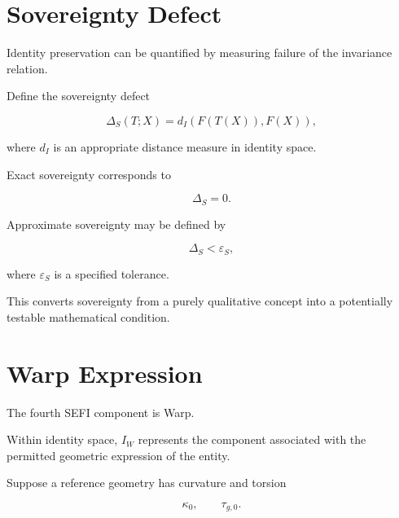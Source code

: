 \documentclass[12pt,oneside]{book}
\begin{document}
\section{Sovereignty Defect}
\label{sec:sovereignty-defect}

Identity preservation can be quantified by measuring failure of
the invariance relation.

Define the sovereignty defect

\begin{equation}
    \Delta_S(T;X)
    =
    d_I
    \left(
        F(T(X)),
        F(X)
    \right),
    \label{eq:sovereignty-defect}
\end{equation}

where \(d_I\) is an appropriate distance measure in identity
space.

Exact sovereignty corresponds to

\begin{equation}
    \Delta_S
    =
    0.
    \label{eq:exact-sovereignty}
\end{equation}

Approximate sovereignty may be defined by

\begin{equation}
    \Delta_S
    <
    \varepsilon_S,
    \label{eq:approximate-sovereignty}
\end{equation}

where \(\varepsilon_S\) is a specified tolerance.

This converts sovereignty from a purely qualitative concept into
a potentially testable mathematical condition.


\section{Warp Expression}
\label{sec:identity-warp-expression}

The fourth SEFI component is Warp.

Within identity space, \(I_W\) represents the component
associated with the permitted geometric expression of the
entity.

Suppose a reference geometry has curvature and torsion

\begin{equation}
    \kappa_0,
    \qquad
    \tau_{g,0}.
\end{equation}
\end{document}
